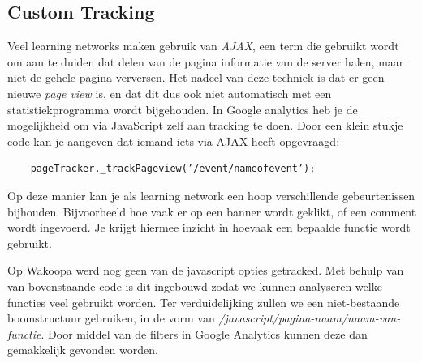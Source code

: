 \documentclass[a4paper, 10pt, pdftex]{report}
\begin{document}
    \subsection{Custom Tracking}
    Veel learning networks maken gebruik van \emph{AJAX}, een term die gebruikt wordt om aan te duiden dat delen van de pagina informatie van de server halen, maar niet de gehele pagina verversen. Het nadeel van deze techniek is dat er geen nieuwe \emph{page view} is, en dat dit dus ook niet automatisch met een statistiekprogramma wordt bijgehouden. In Google analytics heb je de mogelijkheid om via JavaScript zelf aan tracking te doen. Door een klein stukje code kan je aangeven dat iemand iets via AJAX heeft opgevraagd:
    \begin{verbatim}
    pageTracker._trackPageview(’/event/nameofevent’);
    \end{verbatim}
    Op deze manier kan je als learning network een hoop verschillende gebeurtenissen bijhouden. Bijvoorbeeld hoe vaak er op een banner wordt geklikt, of een comment wordt ingevoerd. Je krijgt hiermee inzicht in hoevaak een bepaalde functie wordt gebruikt.

    Op Wakoopa werd nog geen van de javascript opties getracked. Met behulp van van bovenstaande code is dit ingebouwd zodat we kunnen analyseren welke functies veel gebruikt worden. Ter verduidelijking zullen we een niet-bestaande boomstructuur gebruiken, in de vorm van \emph{/javascript/pagina-naam/naam-van-functie}. Door middel van de filters in Google Analytics kunnen deze dan gemakkelijk gevonden worden.
\end{document}
